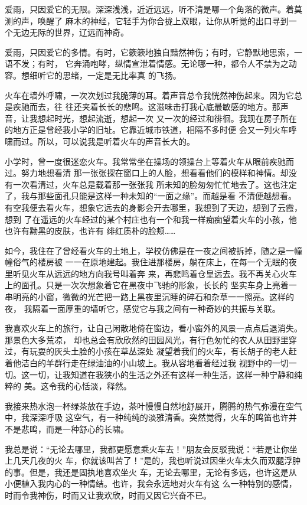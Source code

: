 		爱雨，只因爱它的无限。深深浅浅，近近远远，听不清是哪一个角落的微声。着莫测的声，唤醒了
	麻木的神经，它轻手为你合拢上双眼，让你从听觉的出口寻到一个无边无际的世界，辽远而神奇。

		爱雨，只因爱它的多情。有时，它簌簌地独自黯然神伤；有时，它静默地思索，一语不发；有时，
	它奔涌咆哮，纵情宣泄着情感。无论哪一种，都令人不禁为之动容。想细听它的思绪，一定是无比率真
	的飞扬。

	\endwriting



		火车在墙外呼啸，一次次划过我脆薄的耳。着声音总令我恍然神伤起来。因为它总是疾驰而去，往
	往还夹着长长的悲鸣。这滋味击打我心底最敏感的地方。那声音，让我想起时光，想起流逝，想起一次
	又一次的经过和徘徊。我现在房子所在的地方正是曾经我小学的旧址。它靠近城市铁道，相隔不多时便
	会又一列火车呼啸而过。所以，可以说我是听着火车的声音长大的。

		小学时，曾一度很迷恋火车。我常常坐在操场的领操台上等着火车从眼前疾驰而过。努力地想看清
	那一张张探在窗口上的人脸，想看看他们的模样和神情。却没有一次看清过，火车总是载着那一张张我
	所未知的脸匆匆忙忙地去了。这也注定了，我与那些面孔只能是这样一种未知的“一面之缘”。而越是看
	不清便越想看。有空我便去看火车，想象它远去的身影会开去哪里，我想到了天边，想到了云霞，想到
	了在遥远的火车经过的某个村庄也有一个和我一样痴痴望着火车的小孩，他也许有黝黑的皮肤，也许有
	绯红质朴的脸颊……

		如今，我住在了曾经看火车的土地上，学校仿佛是在一夜之间被拆掉，随之是一幢幢俗气的楼房被
	一一在原地建起。我住进那楼房，躺在床上，在每一个无眠的夜里听见火车从远远的地方向我号叫着奔
	来，再悲鸣着仓皇远去。我不再关心火车上的面孔。只是一次次想象着它在黑夜中飞驰的形象，长长的
	坚实车身上亮着一串明亮的小窗，微微的光芒把一路上黑夜里沉睡的碎石和杂草一一照亮。这样的夜，
	我隔着一面厚重的墙听它，感觉它与我之间有一种奇妙的共振与关联。

		我喜欢火车上的旅行，让自己闲散地倚在窗边，看小窗外的风景一点点后退消失。那景色大多荒凉，
	却也总会有欣欣然的田园风光，有行色匆忙的农人从田野里穿过，有玩耍的灰头土脸的小孩在草丛深处
	凝望着我们的火车，有长胡子的老人赶着他洁白的羊群行走在绿油油的小山坡上。我从容地看着经过我
	视野中的一切一切。这一切，让我知道在我狭小的生活之外还有这样一种生活，这样一种宁静和纯粹的
	美。这令我的心恬淡，释然。

		我接来热水泡一杯绿茶放在手边，茶叶慢慢自然地舒展开，腾腾的热气弥漫在空气中，我深深呼吸
	这空气，有一种纯纯的淡雅清香。突然觉得，火车的鸣笛也许并不是悲鸣，而是一种舒心的长啸。

		我总是说：“无论去哪里，我都更愿意乘火车去！”朋友会反驳我说：“若是让你坐上几天几夜的火
	车，你就该叫苦了！”是的，我也听说过因坐火车太久而双腿浮肿的事。但是，我还是固执地喜欢坐火
	车，无论去哪里，无论有多远，也许这是从小便植入我内心的一种情结。也许，我会永远地对火车有这
	么一种特别的感情，时而令我神伤，时而又让我欢欣，时而又因它兴奋不已。

